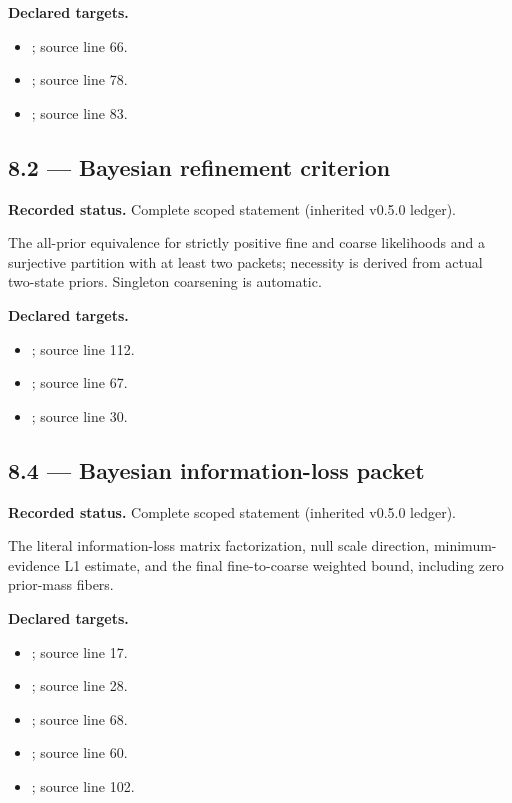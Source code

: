 \textbf{Declared targets.}\begin{itemize}
\item {}; source line 66.
\item {}; source line 78.
\item {}; source line 83.
\end{itemize}
\subsection{8.2 — Bayesian refinement criterion}
\label{result:8.2}
\textbf{Recorded status.} Complete scoped statement (inherited v0.5.0 ledger).\par
The all-prior equivalence for strictly positive fine and coarse likelihoods and a surjective partition with at least two packets; necessity is derived from actual two-state priors. Singleton coarsening is automatic.

\textbf{Declared targets.}\begin{itemize}
\item {}; source line 112.
\item {}; source line 67.
\item {}; source line 30.
\end{itemize}
\subsection{8.4 — Bayesian information-loss packet}
\label{result:8.4}
\textbf{Recorded status.} Complete scoped statement (inherited v0.5.0 ledger).\par
The literal information-loss matrix factorization, null scale direction, minimum-evidence L1 estimate, and the final fine-to-coarse weighted bound, including zero prior-mass fibers.

\textbf{Declared targets.}\begin{itemize}
\item {}; source line 17.
\item {}; source line 28.
\item {}; source line 68.
\item {}; source line 60.
\item {}; source line 102.
\end{itemize}
